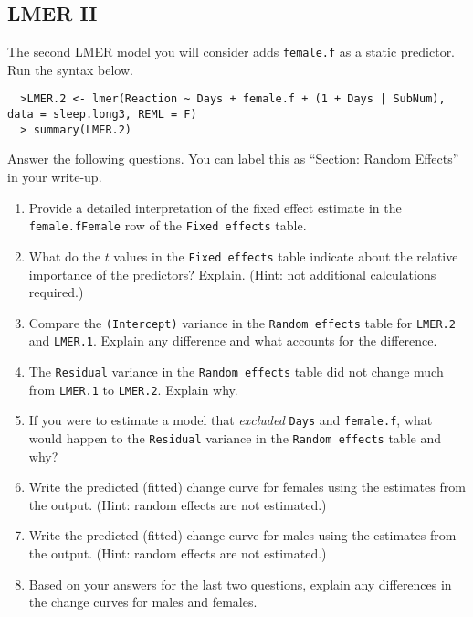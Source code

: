 \documentclass[]{article}
\begin{document}
%
%
\pagebreak
\subsection*{LMER II}

\noindent The second LMER model you will consider adds \texttt{female.f} as a static predictor. Run the syntax below.

\begin{verbatim}
  >LMER.2 <- lmer(Reaction ~ Days + female.f + (1 + Days | SubNum), data = sleep.long3, REML = F)
  > summary(LMER.2)
\end{verbatim}

\noindent Answer the following questions. You can label this as ``Section: Random Effects'' in your
write-up.

\begin{enumerate}[resume]
\item Provide a detailed interpretation of the fixed effect estimate in the \texttt{female.fFemale} row of the \texttt{Fixed effects} table.
\item What do the $t$ values in the \texttt{Fixed effects} table indicate about the relative importance of the predictors? Explain. (Hint: not additional calculations required.)
\item Compare the \texttt{(Intercept)} variance in the \texttt{Random effects} table for \texttt{LMER.2} and \texttt{LMER.1}. Explain any difference and what accounts for the difference.
\item The \texttt{Residual} variance in the \texttt{Random effects} table did not change much from \texttt{LMER.1} to \texttt{LMER.2}. Explain why.
\item If you were to estimate a model that \emph{excluded} \texttt{Days} and \texttt{female.f}, what would happen to the \texttt{Residual} variance in the \texttt{Random effects} table and why?
\item Write the predicted (fitted) change curve for females using the estimates from the output. (Hint: random effects are not estimated.)
\item Write the predicted (fitted) change curve for males using the estimates from the output. (Hint: random effects are not estimated.)
\item Based on your answers for the last two questions, explain any differences in the change curves for males and females.
\end{enumerate}
\end{document}
